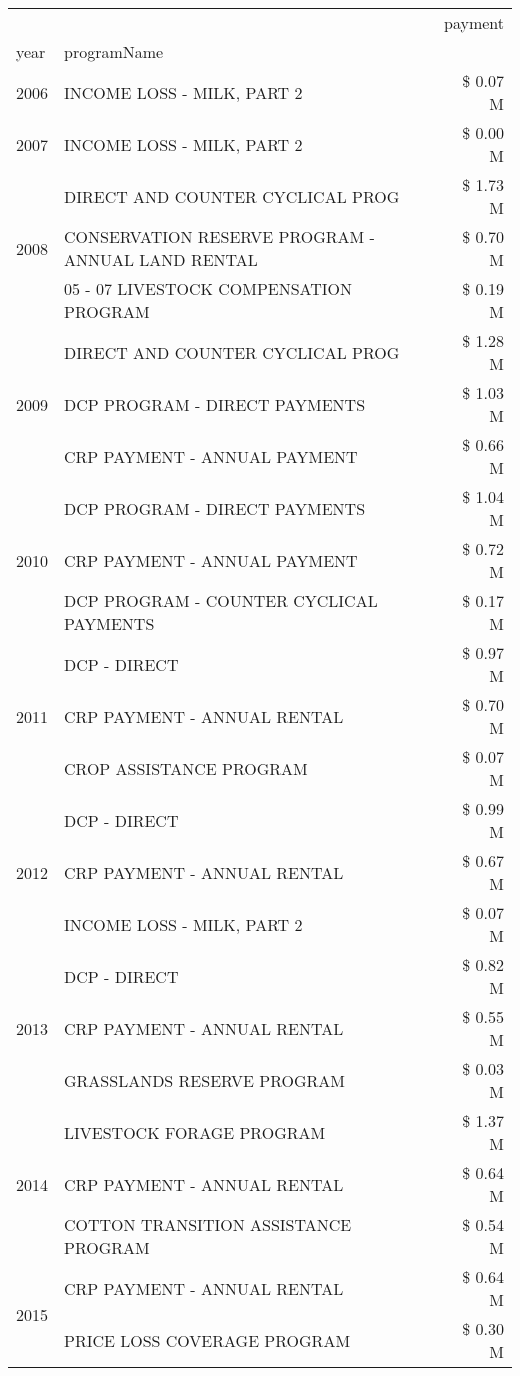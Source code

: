 \begin{tabular}{llr}
\toprule
 &  & payment \\
year & programName &  \\
\midrule
2006 & INCOME LOSS - MILK, PART 2 & \$ 0.07 M \\
\cline{1-3}
2007 & INCOME LOSS - MILK, PART 2 & \$ 0.00 M \\
\cline{1-3}
\multirow[t]{3}{*}{2008} & DIRECT AND COUNTER CYCLICAL PROG & \$ 1.73 M \\
 & CONSERVATION RESERVE PROGRAM - ANNUAL LAND RENTAL & \$ 0.70 M \\
 & 05 - 07 LIVESTOCK COMPENSATION PROGRAM & \$ 0.19 M \\
\cline{1-3}
\multirow[t]{3}{*}{2009} & DIRECT AND COUNTER CYCLICAL PROG & \$ 1.28 M \\
 & DCP PROGRAM - DIRECT PAYMENTS & \$ 1.03 M \\
 & CRP PAYMENT - ANNUAL PAYMENT & \$ 0.66 M \\
\cline{1-3}
\multirow[t]{3}{*}{2010} & DCP PROGRAM - DIRECT PAYMENTS & \$ 1.04 M \\
 & CRP PAYMENT - ANNUAL PAYMENT & \$ 0.72 M \\
 & DCP PROGRAM - COUNTER CYCLICAL PAYMENTS & \$ 0.17 M \\
\cline{1-3}
\multirow[t]{3}{*}{2011} & DCP - DIRECT & \$ 0.97 M \\
 & CRP PAYMENT - ANNUAL RENTAL & \$ 0.70 M \\
 & CROP ASSISTANCE PROGRAM & \$ 0.07 M \\
\cline{1-3}
\multirow[t]{3}{*}{2012} & DCP - DIRECT & \$ 0.99 M \\
 & CRP PAYMENT - ANNUAL RENTAL & \$ 0.67 M \\
 & INCOME LOSS - MILK, PART 2 & \$ 0.07 M \\
\cline{1-3}
\multirow[t]{3}{*}{2013} & DCP - DIRECT & \$ 0.82 M \\
 & CRP PAYMENT - ANNUAL RENTAL & \$ 0.55 M \\
 & GRASSLANDS RESERVE PROGRAM & \$ 0.03 M \\
\cline{1-3}
\multirow[t]{3}{*}{2014} & LIVESTOCK FORAGE PROGRAM & \$ 1.37 M \\
 & CRP PAYMENT - ANNUAL RENTAL & \$ 0.64 M \\
 & COTTON TRANSITION ASSISTANCE PROGRAM & \$ 0.54 M \\
\cline{1-3}
\multirow[t]{3}{*}{2015} & CRP PAYMENT - ANNUAL RENTAL & \$ 0.64 M \\
 & PRICE LOSS COVERAGE PROGRAM & \$ 0.30 M \\

\end{tabular}
